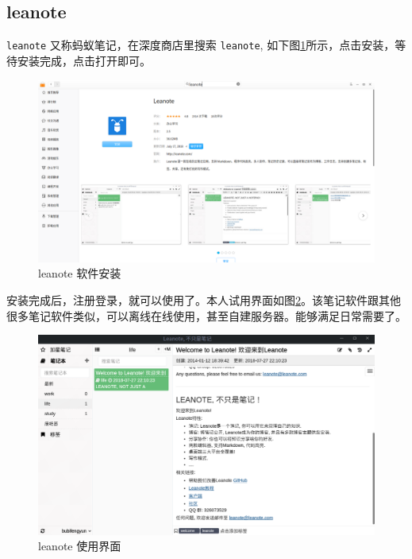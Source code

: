 \documentclass[doctor,openright,twoside]{sjtuthesis}
\newcommand{\passthrough}[1]{#1}
\theoremstyle{plain}
\theoremstyle{definition}
\theoremstyle{remark}
\theoremstyle{ocrenumbox}
\theoremstyle{plain}
\begin{document}
\hypertarget{leanote}{%
\subsection{leanote}\label{leanote}}

\passthrough{\lstinline!leanote!} 又称蚂蚁笔记，在深度商店里搜索
\passthrough{\lstinline!leanote!},
如下图\ref{fig:leanote-install}所示，点击安装，等待安装完成，点击打开即可。

\begin{figure}

{\centering \includegraphics[width=1\linewidth]{images/education-leanote-install} 

}

\caption[leanote 软件安装]{leanote 软件安装}\label{fig:leanote-install}
\end{figure}

安装完成后，注册登录，就可以使用了。本人试用界面如图\ref{fig:leanote-use}。该笔记软件跟其他很多笔记软件类似，可以离线在线使用，甚至自建服务器。能够满足日常需要了。

\begin{figure}

{\centering \includegraphics[width=1\linewidth]{images/education-leanote-use} 

}

\caption[leanote 使用界面]{leanote 使用界面}\label{fig:leanote-use}
\end{figure}
\end{document}
